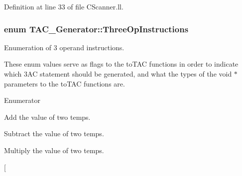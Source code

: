Definition at line 33 of file C\-Scanner.\-ll.

\hypertarget{classTAC__Generator_ae032b80a215a10604c5273b65e7dab4c}{
\subsubsection[{Three\-Op\-Instructions}]{\setlength{\rightskip}{0pt plus 5cm}enum {\bf T\-A\-C\-\_\-\-Generator\-::\-Three\-Op\-Instructions}}}\label{classTAC__Generator_ae032b80a215a10604c5273b65e7dab4c}


Enumeration of 3 operand instructions. 

These enum values serve as flags to the to\-T\-A\-C functions in order to indicate which 3\-A\-C statement should be generated, and what the types of the void $\ast$ parameters to the to\-T\-A\-C functions are. \begin{Desc}
\item[Enumerator]\par
\begin{description}
\item[{\em 
\hypertarget{classTAC__Generator_ae032b80a215a10604c5273b65e7dab4ca53bbfc51b0f492dff408d99b0a5c6f1d}{A\-D\-D}\label{classTAC__Generator_ae032b80a215a10604c5273b65e7dab4ca53bbfc51b0f492dff408d99b0a5c6f1d}
}]Add the value of two temps. \item[{\em 
\hypertarget{classTAC__Generator_ae032b80a215a10604c5273b65e7dab4caf421605e870566ed803e041ea63fc13e}{S\-U\-B}\label{classTAC__Generator_ae032b80a215a10604c5273b65e7dab4caf421605e870566ed803e041ea63fc13e}
}]Subtract the value of two temps. \item[{\em 
\hypertarget{classTAC__Generator_ae032b80a215a10604c5273b65e7dab4ca234829d251fa1caafaf0ccf335d78ffd}{M\-U\-L\-T}\label{classTAC__Generator_ae032b80a215a10604c5273b65e7dab4ca234829d251fa1caafaf0ccf335d78ffd}
}]Multiply the value of two temps. \item[{\em 
}
\end{description}
\end{Desc}
